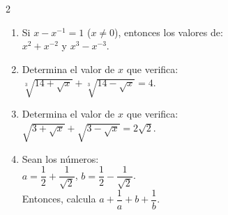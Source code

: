 \documentclass[10pt]{article}
\begin{document}
\begin{multicols}{2}
\begin{enumerate}[label=\textbf{\arabic*.}, itemsep=0.4cm]
			\item Si $x - x^{-1} = 1$ ($x \neq 0$), entonces los valores de: \\
			$x^2 + x^{-2}$ y $x^3 - x^{-3}$.

			\item Determina el valor de $x$ que verifica: \\
			$\sqrt[3]{14 + \sqrt{x}} + \sqrt[3]{14 - \sqrt{x}} = 4$.

			\item Determina el valor de $x$ que verifica: \\
			$\sqrt{3 + \sqrt{x}} + \sqrt{3 - \sqrt{x}} = 2\sqrt{2}$.

			\item Sean los números: \\
			$a = \dfrac{1}{2} + \dfrac{1}{\sqrt{2}}$, $b = \dfrac{1}{2} - \dfrac{1}{\sqrt{2}}$. \\
			Entonces, calcula $a + \dfrac{1}{a} + b + \dfrac{1}{b}$.


		\end{enumerate}

\end{multicols}
\end{document}
